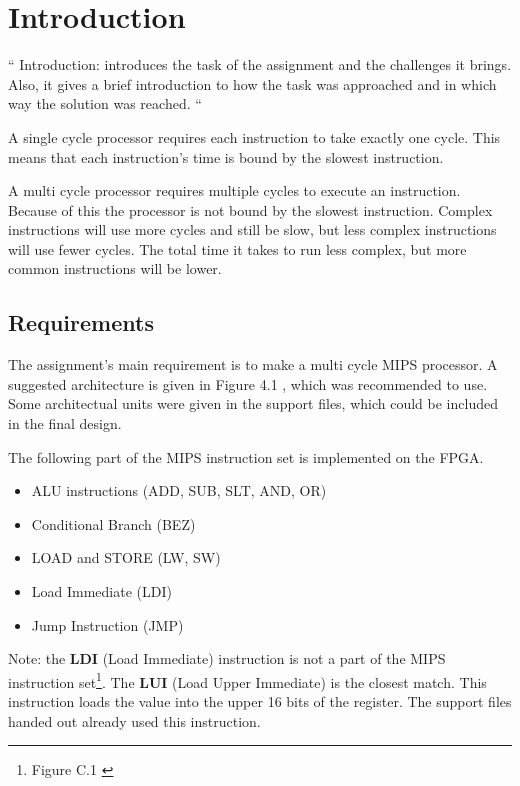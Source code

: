 \section{Introduction}
\label{sec:intro}

``
Introduction: introduces the task of the assignment and the challenges it brings.
Also, it gives a brief introduction to how the task was approached and in which way the solution was reached.
``

A single cycle processor requires each instruction to take exactly one cycle.
This means that each instruction's time is bound by the slowest instruction.

A multi cycle processor requires multiple cycles to execute an instruction.
Because of this the processor is not bound by the slowest instruction.
Complex instructions will use more cycles and still be slow, but less complex instructions will use fewer cycles.
The total time it takes to run less complex, but more common instructions will be lower.

\subsection{Requirements}
\label{subsec:req}
The assignment's main requirement is to make a multi cycle MIPS processor\cite[p.47]{compendium}.
A suggested architecture is given in Figure 4.1 \cite[p.45]{compendium}, which was recommended to use.
Some architectual units were given in the support files, which could be included in the final design.

The following part of the MIPS instruction set is implemented on the FPGA.

\begin{itemize}
    \item ALU instructions (ADD, SUB, SLT, AND, OR)
    \item Conditional Branch (BEZ)
    \item LOAD and STORE (LW, SW)
    \item Load Immediate (LDI)
    \item Jump Instruction (JMP)
\end{itemize}

Note: the {\bf LDI} (Load Immediate) instruction is not a part of the MIPS instruction set\footnote{Figure C.1 \cite[p.66]{compendium}}.
The {\bf LUI} (Load Upper Immediate) is the closest match.
This instruction loads the value into the upper 16 bits of the register.
The support files handed out already used this instruction.

